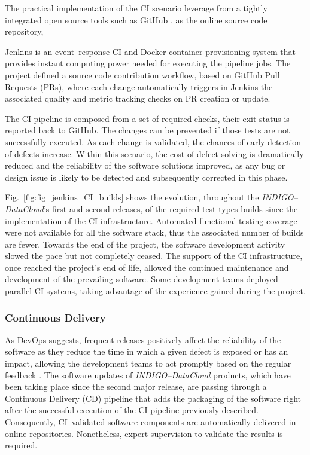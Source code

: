 \documentclass[journal]{IEEEtran}
\begin{document}
The practical implementation of the CI scenario leverage from a tightly integrated open
source tools such as GitHub \cite{foot9}, as the online source code repository,

Jenkins is an event--response CI and Docker container
provisioning system that provides instant computing power needed for executing the pipeline jobs.
The project defined a source code contribution workflow, based on GitHub Pull Requests
(PRs), where each change automatically triggers in Jenkins the associated quality and
metric tracking checks on PR creation or update.

The CI pipeline is composed from a set of required checks, their exit status
is reported back to GitHub. The changes can be prevented if those tests are
not successfully executed.
As each change is validated, the chances
of early detection of defects increase. Within this scenario, the cost of defect solving
is dramatically reduced and the reliability of the software solutions improved, as any
bug or design issue is likely to be detected and subsequently corrected in this phase.

Fig.~\ref{fig:fig_jenkins_CI_builds} shows the evolution, throughout the
{\sl INDIGO--DataCloud}'s first and second releases, of the required test types builds since the
implementation of the CI infrastructure. Automated functional testing coverage were not
available for all the software stack, thus the associated number of builds are fewer.
Towards the end of the project, the software development activity slowed the pace but not completely
ceased. The support of the CI infrastructure, once reached the project's end of life, allowed the
continued maintenance and development of the prevailing software. Some development teams deployed
parallel CI systems, taking advantage of the experience gained during the project.

\subsubsection{Continuous Delivery}
As DevOps suggests, frequent releases positively affect the reliability of the software as
they reduce the time in which a given defect is exposed or has an impact, allowing the
development teams to act promptly based on the regular feedback \cite{chen2015}. The software updates of
{\sl INDIGO--DataCloud} products, which have been taking place since the second major release, are passing through
a Continuous Delivery (CD) pipeline that adds the packaging of the software right after the
successful execution of the CI pipeline previously described. Consequently, CI--validated
software components are automatically delivered in online repositories. Nonetheless,
expert supervision to validate the results is required.
\end{document}
